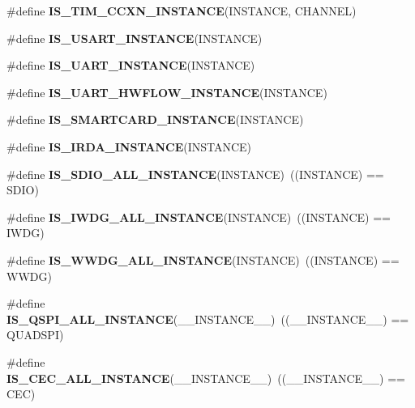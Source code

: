 \begin{DoxyCompactItemize}
\item 
\#define {\bfseries I\+S\+\_\+\+T\+I\+M\+\_\+\+C\+C\+X\+N\+\_\+\+I\+N\+S\+T\+A\+N\+CE}(I\+N\+S\+T\+A\+N\+CE,  C\+H\+A\+N\+N\+EL)
\item 
\#define {\bfseries I\+S\+\_\+\+U\+S\+A\+R\+T\+\_\+\+I\+N\+S\+T\+A\+N\+CE}(I\+N\+S\+T\+A\+N\+CE)
\item 
\#define {\bfseries I\+S\+\_\+\+U\+A\+R\+T\+\_\+\+I\+N\+S\+T\+A\+N\+CE}(I\+N\+S\+T\+A\+N\+CE)
\item 
\#define {\bfseries I\+S\+\_\+\+U\+A\+R\+T\+\_\+\+H\+W\+F\+L\+O\+W\+\_\+\+I\+N\+S\+T\+A\+N\+CE}(I\+N\+S\+T\+A\+N\+CE)
\item 
\#define {\bfseries I\+S\+\_\+\+S\+M\+A\+R\+T\+C\+A\+R\+D\+\_\+\+I\+N\+S\+T\+A\+N\+CE}(I\+N\+S\+T\+A\+N\+CE)
\item 
\#define {\bfseries I\+S\+\_\+\+I\+R\+D\+A\+\_\+\+I\+N\+S\+T\+A\+N\+CE}(I\+N\+S\+T\+A\+N\+CE)
\item 
\#define {\bfseries I\+S\+\_\+\+S\+D\+I\+O\+\_\+\+A\+L\+L\+\_\+\+I\+N\+S\+T\+A\+N\+CE}(I\+N\+S\+T\+A\+N\+CE)~((I\+N\+S\+T\+A\+N\+CE) == S\+D\+IO)\hypertarget{group___exported__macros_ga73932cb2c83be6be1884d3cba2fc0063}{}\label{group___exported__macros_ga73932cb2c83be6be1884d3cba2fc0063}

\item 
\#define {\bfseries I\+S\+\_\+\+I\+W\+D\+G\+\_\+\+A\+L\+L\+\_\+\+I\+N\+S\+T\+A\+N\+CE}(I\+N\+S\+T\+A\+N\+CE)~((I\+N\+S\+T\+A\+N\+CE) == I\+W\+DG)\hypertarget{group___exported__macros_gad9ec4c52f0572ee67d043e006f1d5e39}{}\label{group___exported__macros_gad9ec4c52f0572ee67d043e006f1d5e39}

\item 
\#define {\bfseries I\+S\+\_\+\+W\+W\+D\+G\+\_\+\+A\+L\+L\+\_\+\+I\+N\+S\+T\+A\+N\+CE}(I\+N\+S\+T\+A\+N\+CE)~((I\+N\+S\+T\+A\+N\+CE) == W\+W\+DG)\hypertarget{group___exported__macros_gac2a8aaec233e19987232455643a04d6f}{}\label{group___exported__macros_gac2a8aaec233e19987232455643a04d6f}

\item 
\#define {\bfseries I\+S\+\_\+\+Q\+S\+P\+I\+\_\+\+A\+L\+L\+\_\+\+I\+N\+S\+T\+A\+N\+CE}(\+\_\+\+\_\+\+I\+N\+S\+T\+A\+N\+C\+E\+\_\+\+\_\+)~((\+\_\+\+\_\+\+I\+N\+S\+T\+A\+N\+C\+E\+\_\+\+\_\+) == Q\+U\+A\+D\+S\+PI)\hypertarget{group___exported__macros_ga3ddb10b5455f3b1414b3ecd754ef723a}{}\label{group___exported__macros_ga3ddb10b5455f3b1414b3ecd754ef723a}

\item 
\#define {\bfseries I\+S\+\_\+\+C\+E\+C\+\_\+\+A\+L\+L\+\_\+\+I\+N\+S\+T\+A\+N\+CE}(\+\_\+\+\_\+\+I\+N\+S\+T\+A\+N\+C\+E\+\_\+\+\_\+)~((\+\_\+\+\_\+\+I\+N\+S\+T\+A\+N\+C\+E\+\_\+\+\_\+) == C\+EC)\hypertarget{group___exported__macros_ga5a2f0c43702d75ac8a33597e2f72f611}{}\label{group___exported__macros_ga5a2f0c43702d75ac8a33597e2f72f611}


\end{DoxyCompactItemize}

